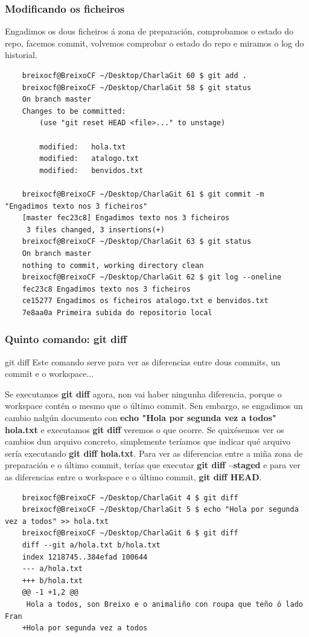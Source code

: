 \begin{frame}[fragile]
	\frametitle{Modificando os ficheiros}
	\scriptsize
	Engadimos os dous ficheiros á zona de preparación, comprobamos o estado do repo, facemos commit, volvemos comprobar o estado do repo e miramos o log do historial.
	\tiny 
	\begin{verbatim}
	breixocf@BreixoCF ~/Desktop/CharlaGit 60 $ git add .
	breixocf@BreixoCF ~/Desktop/CharlaGit 58 $ git status
	On branch master
	Changes to be committed:
 		(use "git reset HEAD <file>..." to unstage)
	
		modified:   hola.txt
		modified:   atalogo.txt
		modified:   benvidos.txt
		
	breixocf@BreixoCF ~/Desktop/CharlaGit 61 $ git commit -m "Engadimos texto nos 3 ficheiros"
	[master fec23c8] Engadimos texto nos 3 ficheiros
	 3 files changed, 3 insertions(+)
	breixocf@BreixoCF ~/Desktop/CharlaGit 63 $ git status
	On branch master
	nothing to commit, working directory clean
	breixocf@BreixoCF ~/Desktop/CharlaGit 62 $ git log --oneline
	fec23c8 Engadimos texto nos 3 ficheiros
	ce15277 Engadimos os ficheiros atalogo.txt e benvidos.txt
	7e8aa0a Primeira subida do repositorio local
	\end{verbatim}
\end{frame}

\begin{frame}[fragile]
	\frametitle{Quinto comando: git diff}
	\begin{block}{git diff}
		Este comando serve para ver as diferencias entre dous commits, un commit e o workspace...
	\end{block}
	\tiny
	Se executamos \textbf{git diff} agora, non vai haber ningunha diferencia, porque o workspace contén o mesmo que o último commit. Sen embargo, se engadimos un cambio nalgún documento con \textbf{echo "Hola por segunda vez a todos" \guillemotright hola.txt} e executamos \textbf{git diff} veremos o que ocorre. Se quixésemos ver os cambios dun arquivo concreto, simplemente teríamos que indicar qué arquivo sería executando \textbf{git diff hola.txt}. Para ver as diferencias entre a miña zona de preparación e o último commit, terías que executar \textbf{git diff --staged} e para ver as diferencias entre o workspace e o último commit, \textbf{git diff HEAD}.
	\tiny 
	\begin{verbatim}
	breixocf@BreixoCF ~/Desktop/CharlaGit 4 $ git diff
	breixocf@BreixoCF ~/Desktop/CharlaGit 5 $ echo "Hola por segunda vez a todos" >> hola.txt
	breixocf@BreixoCF ~/Desktop/CharlaGit 6 $ git diff
	diff --git a/hola.txt b/hola.txt
	index 1218745..384efad 100644
	--- a/hola.txt
	+++ b/hola.txt
	@@ -1 +1,2 @@
	 Hola a todos, son Breixo e o animaliño con roupa que teño ó lado Fran
	+Hola por segunda vez a todos
	\end{verbatim}
\end{frame}

